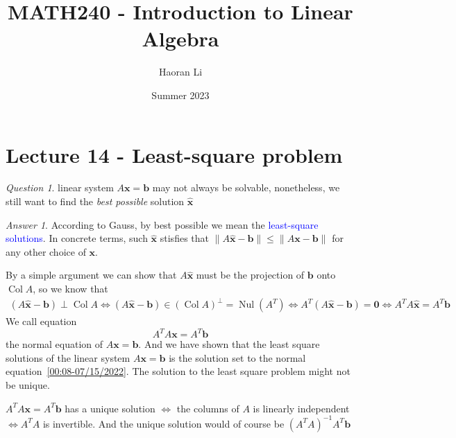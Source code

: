 \documentclass{beamer}
\title{MATH240 - Introduction to Linear Algebra}
\author{Haoran Li}
\institute[UMD]{University of Maryland, College Park}
\date{Summer 2023}
\DeclareMathOperator{\Nul}{Nul}
\DeclareMathOperator{\Col}{Col}
\theoremstyle{definition}
\theoremstyle{remark}
\newtheorem*{question}{Question}
\newtheorem*{answer}{Answer}
\begin{document}
\maketitle

\section{Lecture 14 - Least-square problem}

\begin{frame}[t]
\begin{question}
linear system $A\mathbf x=\mathbf b$ may not always be solvable, nonetheless, we still want to find the \textit{best possible} solution $\hat{\mathbf x}$
\end{question}
\pause
\begin{answer}
According to Gauss, by best possible we mean the \textcolor{blue}{least-square solutions}. In concrete terms, such $\hat{\mathbf x}$ stisfies that $\|A\hat{\mathbf x}-\mathbf b\|\leq\|A\mathbf x-\mathbf b\|$ for any other choice of $\mathbf x$.
\end{answer}
\pause
By a simple argument we can show that $A\hat{\mathbf x}$ must be the projection of $\mathbf b$ onto $\Col A$\pause, so we know that
\begin{align*}
(A\hat{\mathbf x}-\mathbf b)\perp\Col A\iff(A\hat{\mathbf x}-\mathbf b)\in(\Col A)^\perp=\Nul(A^T)\iff A^T(A\hat{\mathbf x}-\mathbf b)=\mathbf 0\iff A^TA\hat{\mathbf x}=A^T\mathbf b
\end{align*}
\pause
We call equation
\begin{equation}\label{00:08-07/15/2022}
A^TA\mathbf x=A^T\mathbf b
\end{equation}
the normal equation of $A\mathbf x=\mathbf b$\pause. And we have shown that the least square solutions of the linear system $A\mathbf x=\mathbf b$ is the solution set to the normal equation~\eqref{00:08-07/15/2022}\pause. The solution to the least square problem might not be unique.
\end{frame}

\begin{frame}[t]
\begin{theorem}
$A^TA\mathbf x=A^T\mathbf b$ has a unique solution $\iff$ the columns of $A$ is linearly independent $\iff A^TA$ is invertible. And the unique solution would of course be $(A^TA)^{-1}A^T\mathbf b$
\end{theorem}
\end{frame}
\end{document}
